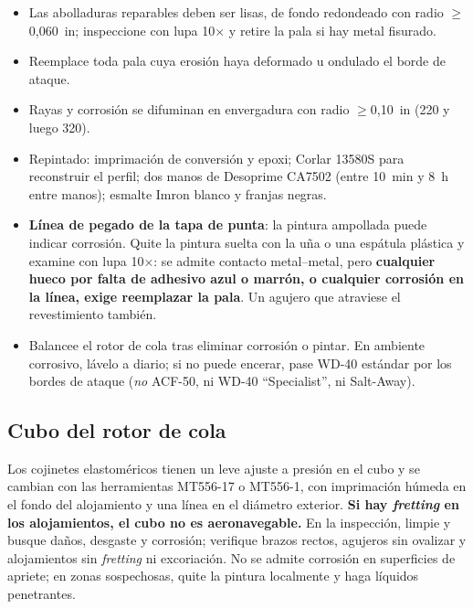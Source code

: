 \begin{itemize}
\item Las abolladuras reparables deben ser lisas, de fondo redondeado con radio $\ge$0,060~in; inspeccione con lupa 10$\times$ y retire la pala si hay metal fisurado.
\item Reemplace toda pala cuya erosión haya deformado u ondulado el borde de ataque.
\item Rayas y corrosión se difuminan en envergadura con radio $\ge$0,10~in (220 y luego 320).
\item Repintado: imprimación de conversión y epoxi; Corlar 13580S para reconstruir el perfil; dos manos de Desoprime CA7502 (entre 10~min y 8~h entre manos); esmalte Imron blanco y franjas negras.
\item \textbf{Línea de pegado de la tapa de punta}: la pintura ampollada puede indicar corrosión. Quite la pintura suelta con la uña o una espátula plástica y examine con lupa 10$\times$: se admite contacto metal--metal, pero \textbf{cualquier hueco por falta de adhesivo azul o marrón, o cualquier corrosión en la línea, exige reemplazar la pala}. Un agujero que atraviese el revestimiento también.
\item Balancee el rotor de cola tras eliminar corrosión o pintar. En ambiente corrosivo, lávelo a diario; si no puede encerar, pase WD-40 estándar por los bordes de ataque (\emph{no} ACF-50, ni WD-40 ``Specialist'', ni Salt-Away).
\end{itemize}

\subsection{Cubo del rotor de cola}

Los cojinetes elastoméricos tienen un leve ajuste a presión en el cubo y se cambian con las herramientas MT556-17 o MT556-1, con imprimación húmeda en el fondo del alojamiento y una línea en el diámetro exterior. \textbf{Si hay \emph{fretting} en los alojamientos, el cubo no es aeronavegable.} En la inspección, limpie y busque daños, desgaste y corrosión; verifique brazos rectos, agujeros sin ovalizar y alojamientos sin \emph{fretting} ni excoriación. No se admite corrosión en superficies de apriete; en zonas sospechosas, quite la pintura localmente y haga líquidos penetrantes.
